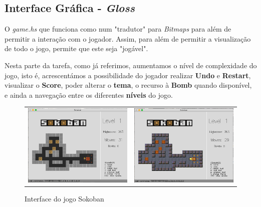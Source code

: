 \documentclass[12pt,a4paper]{report}
\begin{document}
\hfill

\hfill

\subsection{Interface Gráfica - \emph{Gloss}}

\hfill

O \emph{game.hs} que funciona como num "tradutor" para \emph{Bitmaps} para além de permitir a interação com o jogador. Assim, para além de permitir a visualização de todo o jogo, permite que este seja "jogável".

Nesta parte da tarefa, como já referimos, aumentamos o nível de complexidade do jogo, isto é, acrescentámos a possibilidade do jogador realizar \textbf{Undo} e \textbf{Restart}, visualizar o \textbf{Score}, poder alterar o \textbf{tema}, o recurso à \textbf{Bomb} quando disponível, e ainda a navegação entre os diferentes \textbf{níveis} do jogo.

\begin{figure}[htb]
\centering
  \begin{tabular}{@{}cc@{}}
    \includegraphics[scale=0.25]{images/print1.png} &
    \includegraphics[scale=0.25]{images/print8.png}
  \end{tabular}
  \caption{Interface do jogo Sokoban}
\end{figure}
\end{document}
